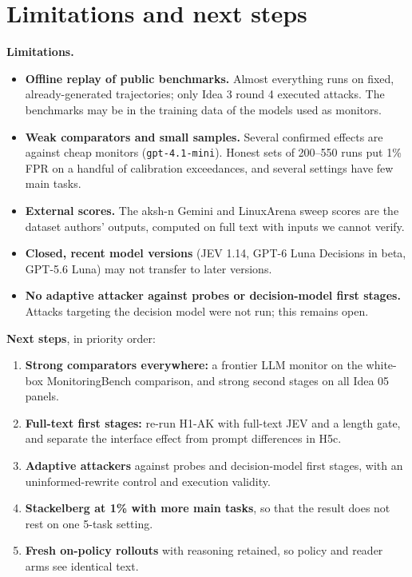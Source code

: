 \documentclass[11pt]{article}
\begin{document}
\section{Limitations and next steps}
\textbf{Limitations.}
\begin{itemize}
\item \textbf{Offline replay of public benchmarks.} Almost everything runs on fixed, already-generated trajectories; only Idea 3 round 4 executed attacks. The benchmarks may be in the training data of the models used as monitors.
\item \textbf{Weak comparators and small samples.} Several confirmed effects are against cheap monitors (\texttt{gpt-4.1-mini}). Honest sets of 200--550 runs put 1\% FPR on a handful of calibration exceedances, and several settings have few main tasks.
\item \textbf{External scores.} The aksh-n Gemini and LinuxArena sweep scores are the dataset authors' outputs, computed on full text with inputs we cannot verify.
\item \textbf{Closed, recent model versions} (JEV 1.14, GPT-6 Luna Decisions in beta, GPT-5.6 Luna) may not transfer to later versions.
\item \textbf{No adaptive attacker against probes or decision-model first stages.} Attacks targeting the decision model were not run; this remains open.
\end{itemize}

\textbf{Next steps}, in priority order:
\begin{enumerate}
\item \textbf{Strong comparators everywhere:} a frontier LLM monitor on the white-box MonitoringBench comparison, and strong second stages on all Idea 05 panels.
\item \textbf{Full-text first stages:} re-run H1-AK with full-text JEV and a length gate, and separate the interface effect from prompt differences in H5c.
\item \textbf{Adaptive attackers} against probes and decision-model first stages, with an uninformed-rewrite control and execution validity.
\item \textbf{Stackelberg at 1\% with more main tasks}, so that the result does not rest on one 5-task setting.
\item \textbf{Fresh on-policy rollouts} with reasoning retained, so policy and reader arms see identical text.
\end{enumerate}
\end{document}
